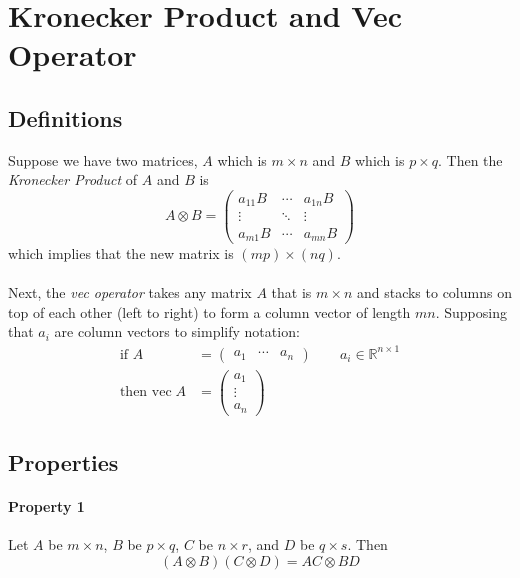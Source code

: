 \documentclass[a4paper,12pt]{scrartcl}
\begin{document}
\newpage
\section{Kronecker Product and Vec Operator}

\subsection{Definitions}
Suppose we have two matrices, $A$ which is $m \times n$ and $B$
which is $p\times q$. Then the {\sl Kronecker Product} of $A$ and $B$ is 
    \[ A \otimes B = \begin{pmatrix} a_{11} B & \cdots & a_{1n} B \\
			    \vdots & \ddots & \vdots \\
			    a_{m1} B & \cdots & a_{mn}B \end{pmatrix}
    \]
which implies that the new matrix is $(mp) \times (nq)$. 
\\
\\
Next, the {\sl vec operator} takes any matrix $A$ that is $m \times n$
and stacks to columns on top of each other (left to right) to 
form a column vector of length $mn$.  Supposing that $a_i$ are column
vectors to simplify notation:
\begin{align*}
    \text{if } A &= \begin{pmatrix} a_1 & \cdots & a_n \end{pmatrix}
	\qquad a_i \in \mathbb{R}^{n\times 1} \\
    \text{then } \text{vec}\; A &= 
	\begin{pmatrix} a_1 \\ \vdots \\ a_n \end{pmatrix}
\end{align*}


\subsection{Properties}

\paragraph{Property 1} Let $A$ be $m\times n$, $B$ be $p \times q$,
$C$ be $n\times r$, and $D$ be $q \times s$. Then
\begin{equation}
    (A \otimes B)(C \otimes D) = AC \otimes BD
\end{equation}
\end{document}
